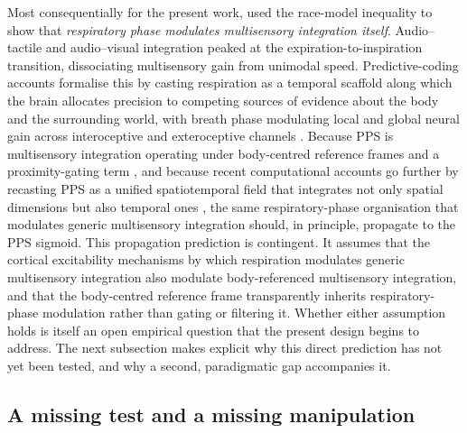Most consequentially for the present work, \citet{saltafossi_2025} used the race-model inequality to show that \emph{respiratory phase modulates multisensory integration itself}. Audio--tactile and audio--visual integration peaked at the expiration-to-inspiration transition, dissociating multisensory gain from unimodal speed. Predictive-coding accounts formalise this by casting respiration as a temporal scaffold along which the brain allocates precision to competing sources of evidence about the body and the surrounding world, with breath phase modulating local and global neural gain across interoceptive and exteroceptive channels \citep{allen_2021, braendholt_2023, engelen_2023}. Because PPS is multisensory integration operating under body-centred reference frames and a proximity-gating term \citep{noel_2018, bertoni_2025, noel_2021}, and because recent computational accounts go further by recasting PPS as a unified spatiotemporal field that integrates not only spatial dimensions but also temporal ones \citep{bertoni_2025}, the same respiratory-phase organisation that modulates generic multisensory integration should, in principle, propagate to the PPS sigmoid. This propagation prediction is contingent. It assumes that the cortical excitability mechanisms by which respiration modulates generic multisensory integration also modulate body-referenced multisensory integration, and that the body-centred reference frame transparently inherits respiratory-phase modulation rather than gating or filtering it. Whether either assumption holds is itself an open empirical question that the present design begins to address. The next subsection makes explicit why this direct prediction has not yet been tested, and why a second, paradigmatic gap accompanies it.

\subsection{A missing test and a missing manipulation}


